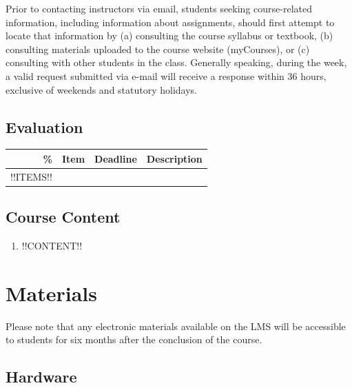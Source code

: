 \documentclass{article}
\begin{document}
Prior to contacting instructors via email, students seeking
course-related information, including information about assignments,
should first attempt to locate that information by (a) consulting the
course syllabus or textbook, (b) consulting materials uploaded to the
course website (myCourses), or (c) consulting with other students in
the class. Generally speaking, during the week, a valid request
submitted via e-mail will receive a response within 36 hours,
exclusive of weekends and statutory holidays.

\newpage

\subsection{Evaluation}
\label{eval}

\begin{center}
  \renewcommand{\arraystretch}{1.2}
  \begin{longtable}{|r|>{\raggedright}p{40mm}|>{\raggedright}p{30mm}|p{80mm}|}
    \hline
        {\bf \%} & {\bf Item} & {\bf Deadline} & {\bf Description} \\
        \hline
        \endhead        
        !!ITEMS!! \\
        \hline
  \end{longtable}
\end{center}

\newpage

\subsection{Course Content}

\begin{enumerate}
\item{!!CONTENT!!}
\end{enumerate}

\newpage

\section{Materials}

Please note that any electronic materials available on the LMS will be
accessible to students for six months after the conclusion of the
course.

\subsection{Hardware}
\end{document}
